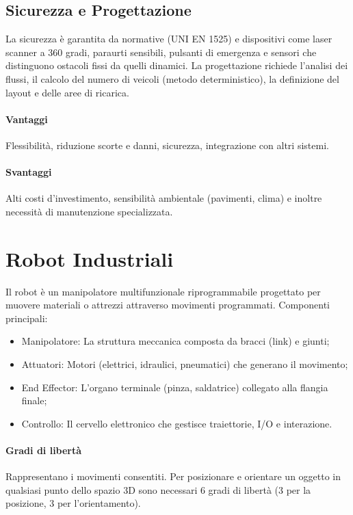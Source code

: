 %
\subsection{Sicurezza e Progettazione}
La sicurezza è garantita da normative (UNI EN 1525) e dispositivi come laser scanner a 360 gradi, paraurti sensibili, pulsanti di emergenza e sensori che distinguono ostacoli fissi da quelli dinamici. La progettazione richiede l'analisi dei flussi, il calcolo del numero di veicoli (metodo deterministico), la definizione del layout e delle aree di ricarica.

%
\paragraph{Vantaggi} Flessibilità, riduzione scorte e danni, sicurezza, integrazione con altri sistemi.
%
\paragraph{Svantaggi} Alti costi d'investimento, sensibilità ambientale (pavimenti, clima) e inoltre necessità di manutenzione specializzata.

%
\section{Robot Industriali}
Il robot è un manipolatore multifunzionale riprogrammabile progettato per muovere materiali o attrezzi attraverso movimenti programmati. Componenti principali:
\begin{itemize}
    \item Manipolatore: La struttura meccanica composta da bracci (link) e giunti;
    \item Attuatori: Motori (elettrici, idraulici, pneumatici) che generano il movimento;
    \item End Effector: L'organo terminale (pinza, saldatrice) collegato alla flangia finale;
    \item Controllo: Il cervello elettronico che gestisce traiettorie, I/O e interazione.
\end{itemize}

%
\paragraph{Gradi di libertà} Rappresentano i movimenti consentiti. Per posizionare e orientare un oggetto in qualsiasi punto dello spazio 3D sono necessari 6 gradi di libertà (3 per la posizione, 3 per l'orientamento).

